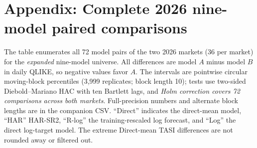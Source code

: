 \section*{Appendix: Complete 2026 nine-model paired comparisons}
The table enumerates all 72 model pairs of the two 2026 markets (36 per market) for the \emph{expanded} nine-model universe. All differences are model $A$ minus model $B$ in daily QLIKE, so negative values favor $A$. The intervals are pointwise circular moving-block percentiles (3,999 replicates; block length 10); tests use two-sided Diebold--Mariano HAC with ten Bartlett lags, and \emph{Holm correction covers 72 comparisons across both markets}. Full-precision numbers and alternate block lengths are in the companion CSV. ``Direct'' indicates the direct-mean model, ``HAR'' HAR-SR2, ``R-log'' the training-rescaled log forecast, and ``Log'' the direct log-target model. The extreme Direct-mean TASI differences are not rounded away or filtered out.
\begingroup\small\setlength{\tabcolsep}{4.2pt}\renewcommand{\arraystretch}{1.09}
